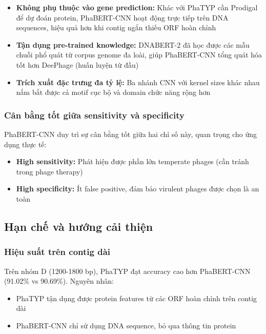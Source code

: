\begin{itemize}
    \item \textbf{Không phụ thuộc vào gene prediction:} Khác với PhaTYP cần Prodigal để dự đoán protein, PhaBERT-CNN hoạt động trực tiếp trên DNA sequences, hiệu quả hơn khi contig ngắn thiếu ORF hoàn chỉnh

    \item \textbf{Tận dụng pre-trained knowledge:} DNABERT-2 đã học được các mẫu chuỗi phổ quát từ corpus genome đa loài, giúp PhaBERT-CNN tổng quát hóa tốt hơn DeePhage (huấn luyện từ đầu)

    \item \textbf{Trích xuất đặc trưng đa tỷ lệ:} Ba nhánh CNN với kernel sizes khác nhau nắm bắt được cả motif cục bộ và domain chức năng rộng hơn
\end{itemize}

\subsubsection{Cân bằng tốt giữa sensitivity và specificity}

PhaBERT-CNN duy trì sự cân bằng tốt giữa hai chỉ số này, quan trọng cho ứng dụng thực tế:

\begin{itemize}
    \item \textbf{High sensitivity:} Phát hiện được phần lớn temperate phages (cần tránh trong phage therapy)
    \item \textbf{High specificity:} Ít false positive, đảm bảo virulent phages được chọn là an toàn
\end{itemize}

\subsection{Hạn chế và hướng cải thiện}

\subsubsection{Hiệu suất trên contig dài}

Trên nhóm D (1200-1800 bp), PhaTYP đạt accuracy cao hơn PhaBERT-CNN (91.02\% vs 90.69\%). Nguyên nhân:

\begin{itemize}
    \item PhaTYP tận dụng được protein features từ các ORF hoàn chỉnh trên contig dài
    \item PhaBERT-CNN chỉ sử dụng DNA sequence, bỏ qua thông tin protein
\end{itemize}


